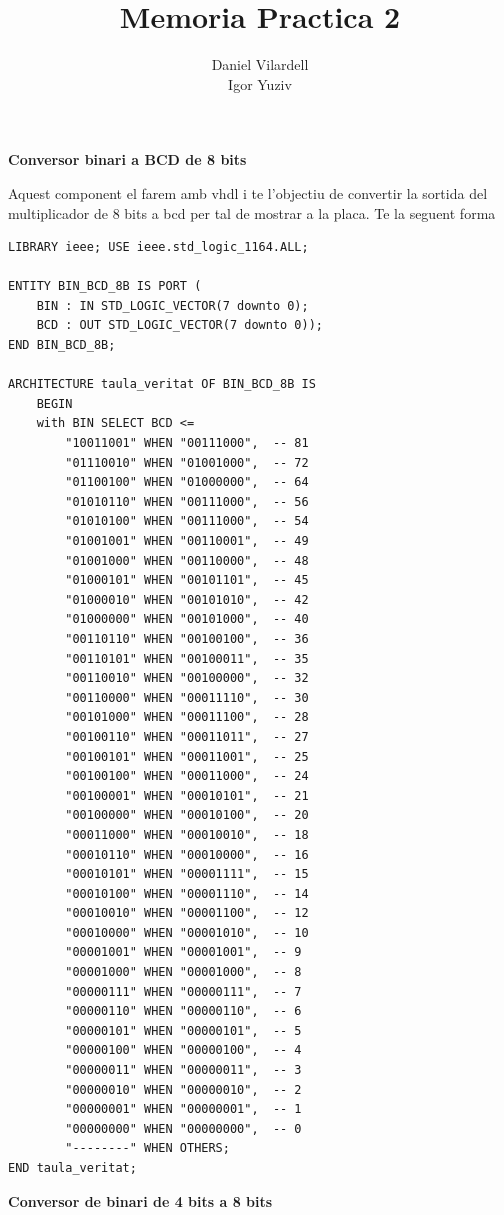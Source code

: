 \documentclass[12pt, a4papre]{article}
\author{Daniel Vilardell\\
	   Igor Yuziv}
\title{Memoria Practica 2}
\date{}
\begin{document}
	\maketitle
	\newpage
	
	\textbf{\large{Conversor binari a BCD de 8 bits}}
	
	Aquest component el farem amb vhdl i te l'objectiu de convertir la sortida del multiplicador de 8 bits a bcd per tal de mostrar a la placa. Te la seguent forma
	\begin{lstlisting}[style=vhdl, frame=single, basicstyle=\tiny]
LIBRARY ieee; USE ieee.std_logic_1164.ALL;  

ENTITY BIN_BCD_8B IS PORT (   
	BIN : IN STD_LOGIC_VECTOR(7 downto 0);   
	BCD : OUT STD_LOGIC_VECTOR(7 downto 0)); 
END BIN_BCD_8B;  

ARCHITECTURE taula_veritat OF BIN_BCD_8B IS   
	BEGIN 
	with BIN SELECT BCD <=     	
		"10011001" WHEN "00111000",  -- 81     
		"01110010" WHEN "01001000",  -- 72      
		"01100100" WHEN "01000000",  -- 64     
		"01010110" WHEN "00111000",  -- 56     
		"01010100" WHEN "00111000",  -- 54        
		"01001001" WHEN "00110001",  -- 49     
		"01001000" WHEN "00110000",  -- 48     
		"01000101" WHEN "00101101",  -- 45     
		"01000010" WHEN "00101010",  -- 42     
		"01000000" WHEN "00101000",  -- 40     
		"00110110" WHEN "00100100",  -- 36     
		"00110101" WHEN "00100011",  -- 35     
		"00110010" WHEN "00100000",  -- 32     
		"00110000" WHEN "00011110",  -- 30     
		"00101000" WHEN "00011100",  -- 28     
		"00100110" WHEN "00011011",  -- 27     
		"00100101" WHEN "00011001",  -- 25     
		"00100100" WHEN "00011000",  -- 24     
		"00100001" WHEN "00010101",  -- 21     
		"00100000" WHEN "00010100",  -- 20     
		"00011000" WHEN "00010010",  -- 18     
		"00010110" WHEN "00010000",  -- 16     
		"00010101" WHEN "00001111",  -- 15     
		"00010100" WHEN "00001110",  -- 14     
		"00010010" WHEN "00001100",  -- 12     
		"00010000" WHEN "00001010",  -- 10     
		"00001001" WHEN "00001001",  -- 9     
		"00001000" WHEN "00001000",  -- 8     
		"00000111" WHEN "00000111",  -- 7     
		"00000110" WHEN "00000110",  -- 6     
		"00000101" WHEN "00000101",  -- 5     
		"00000100" WHEN "00000100",  -- 4    
		"00000011" WHEN "00000011",  -- 3     
		"00000010" WHEN "00000010",  -- 2     
		"00000001" WHEN "00000001",  -- 1     
		"00000000" WHEN "00000000",  -- 0     
		"--------" WHEN OTHERS;   
END taula_veritat;
\end{lstlisting}
	
	\textbf{\large{Conversor de binari de 4 bits a 8 bits}}
	
\end{document}
